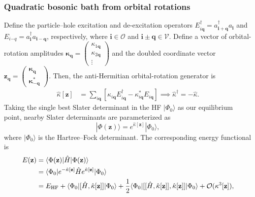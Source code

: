 \subsubsection{Quadratic bosonic bath from orbital rotations}
Define the particle--hole excitation and de-excitation operators  $
    E_{i\mathbf q}^{\dagger}
    =
    a_{\mathbf{i}+\mathbf q}^{\dagger}a_{\mathbf i}$ and $
    E_{i\mathbf -q}
    =
    a_{\mathbf i}^{\dagger}a_{\mathbf{i}-\mathbf q}$, respectively,
where $\mathbf i\in\mathcal O$ and
$\mathbf{i}\pm\mathbf q\in\mathcal V$. Define a vector of orbital-rotation amplitudes
$
    \boldsymbol{\kappa}_{\mathbf q}
    =
    \begin{pmatrix}
        \kappa_{1\mathbf q}\\
        \kappa_{2\mathbf q}\\
        \vdots
    \end{pmatrix}
$ and the doubled coordinate vector $
    {
    \mathbf z_{\mathbf q}
    =
    \begin{pmatrix}
        \boldsymbol{\kappa}_{\mathbf q}\\
        \boldsymbol{\kappa}_{-\mathbf q}^{*}
    \end{pmatrix}
    }
$. Then, the anti-Hermitian orbital-rotation generator is
\begin{align}
    \hat\kappa[\mathbf z]
    &=
    \sum_{i\mathbf q}
    \left[
        \kappa_{i\mathbf q}
        E_{i\mathbf q}^{\dagger}
        -
        \kappa_{i\mathbf q}^{*}
        E_{i\mathbf q}
    \right] \implies
    \hat\kappa^{\dagger}
    =
    -\hat\kappa.
\end{align}
Taking the single best Slater determinant in the HF $|\Phi_0\rangle$ as our equilibrium point, nearby Slater determinants are parameterized as
\begin{equation}
    |\Phi(\mathbf z)\rangle
    =
    e^{\hat\kappa[\mathbf z]}
    |\Phi_0\rangle,
\end{equation}
where $|\Phi_0\rangle$ is the Hartree--Fock determinant. The corresponding energy functional is
\begin{align}
    E(\mathbf z)
    &=
    \langle\Phi(\mathbf z)|
    \hat H
    |\Phi(\mathbf z)\rangle
    \\
    &=
    \langle\Phi_0|
    e^{-\hat\kappa[\mathbf z]}
    \hat H
    e^{\hat\kappa[\mathbf z]}
    |\Phi_0\rangle\\
    &=
    E_{\rm HF}
    +
    \langle\Phi_0|
    [\hat H,\hat\kappa[\mathbf z]]
    |\Phi_0\rangle
+
    \frac{1}{2}
    \langle\Phi_0|
    [[\hat H,\hat\kappa[\mathbf z]],\hat\kappa[\mathbf z]]
    |\Phi_0\rangle
    +
    \mathcal O(\kappa^3[\mathbf z]),
    \label{eq:energy_expansion_kappa}
\end{align}
